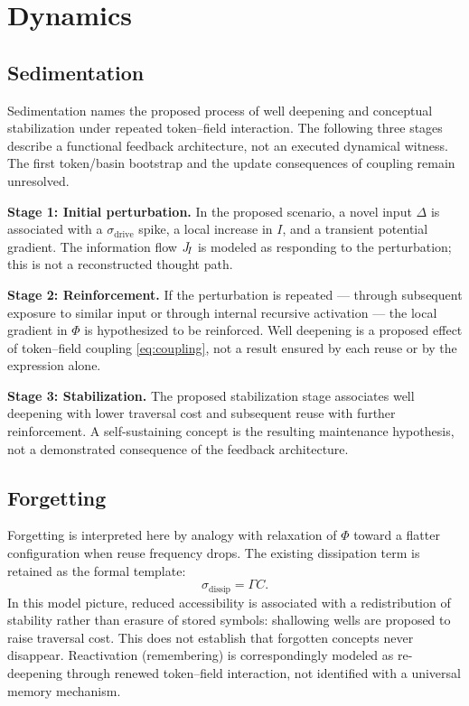 
\section{Dynamics}
\label{sec:dynamics}

\subsection{Sedimentation}

Sedimentation names the proposed process of well deepening and
conceptual stabilization under repeated token--field interaction.
The following three stages describe a functional feedback architecture,
not an executed dynamical witness. The first token/basin bootstrap and
the update consequences of coupling remain unresolved.

\textbf{Stage 1: Initial perturbation.}
In the proposed scenario, a novel input $\Delta$ is associated with
a $\sigma_{\mathrm{drive}}$ spike, a local increase in $I$, and a transient
potential gradient. The information flow $J_{\!I}$ is modeled as responding
to the perturbation; this is not a reconstructed thought path.

\textbf{Stage 2: Reinforcement.}
If the perturbation is repeated --- through subsequent exposure to
similar input or through internal recursive activation --- the local
gradient in $\Phi$ is hypothesized to be reinforced.
Well deepening is a proposed effect of token--field coupling
\eqref{eq:coupling}, not a result ensured by each reuse or by the
expression alone.

\textbf{Stage 3: Stabilization.}
The proposed stabilization stage associates well deepening with lower
traversal cost and subsequent reuse with further reinforcement.
A self-sustaining concept is the resulting maintenance hypothesis,
not a demonstrated consequence of the feedback architecture.

\subsection{Forgetting}

Forgetting is interpreted here by analogy with relaxation of $\Phi$
toward a flatter configuration when reuse frequency drops.
The existing dissipation term is retained as the formal template:
\begin{equation}
  \sigma_{\mathrm{dissip}} = \Gamma C.
\end{equation}
In this model picture, reduced accessibility is associated with a
redistribution of stability rather than erasure of stored symbols:
shallowing wells are proposed to raise traversal cost.
This does not establish that forgotten concepts never disappear.
Reactivation (remembering) is correspondingly modeled as re-deepening
through renewed token--field interaction, not identified with a universal
memory mechanism.


